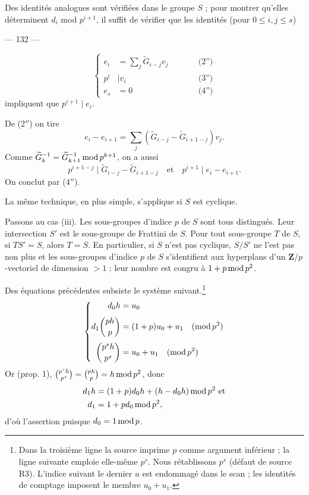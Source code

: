 \documentclass[12pt,reqno]{amsart}
\newcommand{\sourcepage}[1]{%
  \clearpage
  \begin{center}
    --- #1 ---
  \end{center}
  \vspace{0.6em}
}
\begin{document}
Des identités analogues sont vérifiées dans le groupe $S$ ; pour montrer qu'elles déterminent $d_i$ mod $p^{i+1}$, il suffit de vérifier que les identités (pour $0\leq i,j\leq s$)

\sourcepage{132}

\[
\left\{
\begin{alignedat}{2}
e_i&=\sum_j\widetilde G_{i-j}v_j &\qquad& \text{(2'')}\\
p^i&\mid v_i && \text{(3'')}\\
e_s&=0 && \text{(4'')}
\end{alignedat}
\right.
\]
impliquent que $p^{i+1}\mid e_i$.

De (2$''$) on tire
\[
e_i-e_{i+1}=\sum_j(\widetilde G_{i-j}-\widetilde G_{i+1-j})v_j.
\]
Comme $\widetilde G_k^{-1}=\widetilde G_{k+1}^{-1}\mathop{\rm mod}p^{k+1}$, on a aussi
\[
p^{i+1-j}\mid \widetilde G_{i-j}-\widetilde G_{i+1-j}
\quad\text{et}\quad p^{i+1}\mid e_i-e_{i+1}.
\]
On conclut par (4$''$).

La même technique, en plus simple, s'applique si $S$ est cyclique.

Passons au cas (iii). Les sous-groupes d'indice $p$ de $S$ sont tous distingués. Leur intersection $S'$ est le sous-groupe de Frattini de $S$. Pour tout sous-groupe $T$ de $S$, si $TS'=S$, alors $T=S$. En particulier, si $S$ n'est pas cyclique, $S/S'$ ne l'est pas non plus et les sous-groupes d'indice $p$ de $S$ s'identifient aux hyperplans d'un $\mathbf Z/p$-vectoriel de dimension $>1$ ; leur nombre est congru à $1+p\mathop{\rm mod}p^2$.

Des équations précédentes subsiste le système suivant.\footnote{Dans la
troisième ligne la source imprime $p$ comme argument inférieur ; la ligne
suivante emploie elle-même $p^s$. Nous rétablissons $p^s$ (défaut de
source R3). L'indice suivant le dernier $u$ est endommagé dans le scan ;
les identités de comptage imposent le membre $u_0+u_1$.}
\[
\left\{
\begin{aligned}
d_0h&=u_0\\[3pt]
d_1\binom{ph}{p}&=(1+p)u_0+u_1\quad(\mathop{\rm mod}p^2)\\[3pt]
\binom{p^s h}{p^s}&=u_0+u_1\quad(\mathop{\rm mod}p^2)
\end{aligned}
\right.
\]
Or (prop. 1), $\binom{p^s h}{p^s}=\binom{ph}{p}=h\mathop{\rm mod}p^2$, donc
\begin{align*}
d_1h&=(1+p)d_0h+(h-d_0h)\mathop{\rm mod}p^2\text{ et}\\
d_1&=1+pd_0\mathop{\rm mod}p^2,
\end{align*}
d'où l'assertion puisque $d_0=1\mathop{\rm mod}p$.
\end{document}
